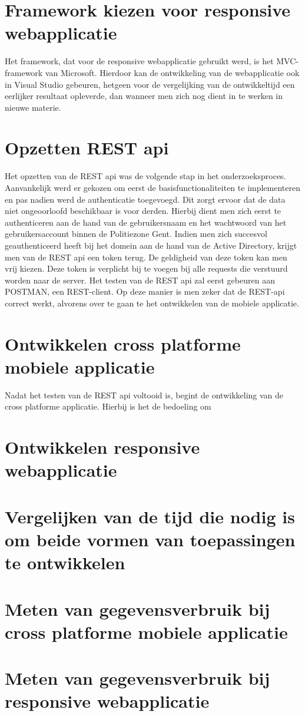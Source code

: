 \section{Framework kiezen voor responsive webapplicatie}
Het framework, dat voor de responsive webapplicatie gebruikt werd, is het MVC-framework van Microsoft.
Hierdoor kan de ontwikkeling van de webapplicatie ook in Visual Studio gebeuren, hetgeen voor de vergelijking van de ontwikkeltijd
een eerlijker resultaat opleverde, dan wanneer men zich nog dient in te werken in nieuwe materie.

\section{Opzetten REST api}
Het opzetten van de REST api was de volgende stap in het onderzoeksproces. Aanvankelijk werd er gekozen om eerst de basisfunctionaliteiten te implementeren en
pas nadien werd de authenticatie toegevoegd. Dit zorgt ervoor dat de data niet ongeoorloofd beschikbaar is voor derden.
Hierbij dient men zich eerst te authenticeren aan de hand van de gebruikersnaam en het wachtwoord van het gebruikersaccount binnen de Politiezone Gent.
Indien men zich succesvol geauthenticeerd heeft bij het domein aan de hand van de Active Directory, krijgt men van de REST api een token terug. De geldigheid van deze token kan men vrij kiezen.
Deze token is verplicht bij te voegen bij alle requests die verstuurd worden naar de server.
Het testen van de REST api zal eerst gebeuren aan POSTMAN, een REST-client. Op deze manier is men zeker dat de REST-api correct werkt, alvorens over te gaan te het ontwikkelen van de mobiele applicatie.

\section{Ontwikkelen cross platforme mobiele applicatie}
Nadat het testen van de REST api voltooid is, begint de ontwikkeling van de cross platforme applicatie. Hierbij is het de bedoeling om

\section{Ontwikkelen responsive webapplicatie}

\section{Vergelijken van de tijd die nodig is om beide vormen van toepassingen te ontwikkelen}

\section{Meten van gegevensverbruik bij cross platforme mobiele applicatie}
\section{Meten van gegevensverbruik bij responsive webapplicatie}
